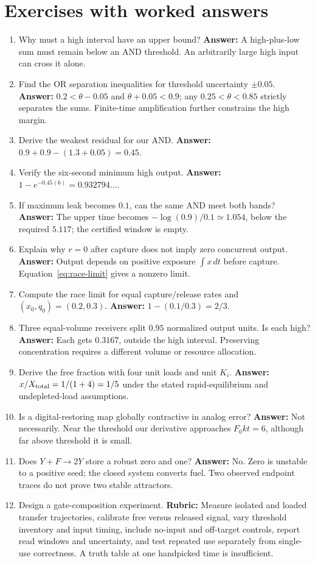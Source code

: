 \section{Exercises with worked answers}
\begin{enumerate}
\item Why must a high interval have an upper bound? \textbf{Answer:}
A high-plus-low sum must remain below an AND threshold. An arbitrarily large
high input can cross it alone.
\item Find the OR separation inequalities for threshold uncertainty
$\pm0.05$. \textbf{Answer:} $0.2<\theta-0.05$ and
$\theta+0.05<0.9$; any $0.25<\theta<0.85$ strictly separates the sums.
Finite-time amplification further constrains the high margin.
\item Derive the weakest residual for our AND. \textbf{Answer:}
$0.9+0.9-(1.3+0.05)=0.45$.
\item Verify the six-second minimum high output. \textbf{Answer:}
$1-e^{-0.45(6)}=0.932794\ldots$.
\item If maximum leak becomes $0.1$, can the same AND meet both bands?
\textbf{Answer:} The upper time becomes $-\log(0.9)/0.1\simeq1.054$,
below the required $5.117$; the certified window is empty.
\item Explain why $r=0$ after capture does not imply zero concurrent output.
\textbf{Answer:} Output depends on positive exposure $\int x\,dt$ before
capture. Equation~\ref{eq:race-limit} gives a nonzero limit.
\item Compute the race limit for equal capture/release rates and
$(x_0,q_0)=(0.2,0.3)$. \textbf{Answer:} $1-(0.1/0.3)=2/3$.
\item Three equal-volume receivers split $0.95$ normalized output units.
Is each high? \textbf{Answer:} Each gets $0.3167$, outside the high interval.
Preserving concentration requires a different volume or resource allocation.
\item Derive the free fraction with four unit loads and unit $K_i$.
\textbf{Answer:} $x/X_{\rm total}=1/(1+4)=1/5$ under the stated
rapid-equilibrium and undepleted-load assumptions.
\item Is a digital-restoring map globally contractive in analog error?
\textbf{Answer:} Not necessarily. Near the threshold our derivative approaches
$F_0kt=6$, although far above threshold it is small.
\item Does $Y+F\to2Y$ store a robust zero and one? \textbf{Answer:}
No. Zero is unstable to a positive seed; the closed system converts fuel.
Two observed endpoint traces do not prove two stable attractors.
\item Design a gate-composition experiment. \textbf{Rubric:} Measure isolated
and loaded transfer trajectories, calibrate free versus released signal, vary
threshold inventory and input timing, include no-input and off-target controls,
report read windows and uncertainty, and test repeated use separately from
single-use correctness. A truth table at one handpicked time is insufficient.
\end{enumerate}

